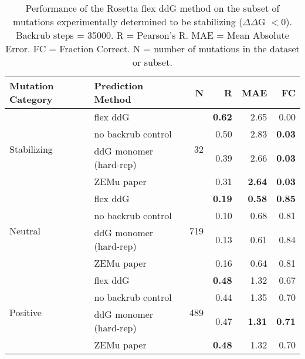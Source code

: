 \begin{table}
  \begin{tabular}{llrrrr}
\toprule
Mutation Category &       Prediction Method &    N &    R &  MAE &   FC \\
\midrule
 \multirow{ 4}{*}{Stabilizing} & flex ddG & \multirow{ 4}{*}{32} & \textbf{0.62} & 2.65 & 0.00  \\
 & no backrub control & & 0.50 & 2.83 & \textbf{0.03}  \\
 & ddG monomer (hard-rep) & & 0.39 & 2.66 & \textbf{0.03}  \\
 & ZEMu paper & & 0.31 & \textbf{2.64} & \textbf{0.03}  \\
\hline
 \multirow{ 4}{*}{Neutral} & flex ddG & \multirow{ 4}{*}{719} & \textbf{0.19} & \textbf{0.58} & \textbf{0.85}  \\
 & no backrub control & & 0.10 & 0.68 & 0.81  \\
 & ddG monomer (hard-rep) & & 0.13 & 0.61 & 0.84  \\
 & ZEMu paper & & 0.16 & 0.64 & 0.81  \\
\hline
 \multirow{ 4}{*}{Positive} & flex ddG & \multirow{ 4}{*}{489} & \textbf{0.48} & 1.32 & 0.67  \\
 & no backrub control & & 0.44 & 1.35 & 0.70  \\
 & ddG monomer (hard-rep) & & 0.47 & \textbf{1.31} & \textbf{0.71}  \\
 & ZEMu paper & & \textbf{0.48} & 1.32 & 0.70  \\
\bottomrule
\end{tabular}
  \caption[Flex ddG performance on stabilizing mutations]{
    Performance of the Rosetta flex ddG method on the subset of mutations experimentally determined to be stabilizing ($\Delta\Delta$G $< 0$). Backrub steps = 35000. R = Pearson's R. MAE = Mean Absolute Error. FC = Fraction Correct. N = number of mutations in the dataset or subset.
  } \label{tab:table-stabilizing}
\end{table}
